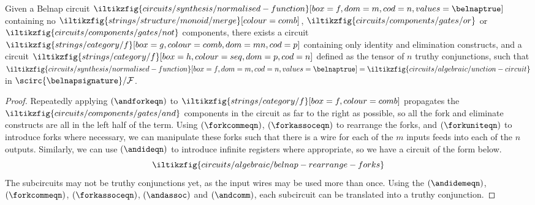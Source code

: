 \begin{lemma}\label{lem:truthy-conjunction-normalising}
    Given a Belnap circuit \(
    \iltikzfig{circuits/synthesis/normalised-function}[box=f,dom=m,cod=n,values=\belnaptrue]
    \) containing no \(
    \iltikzfig{strings/structure/monoid/merge}[colour=comb]
    \), \(
    \iltikzfig{circuits/components/gates/or}
    \) or \(
    \iltikzfig{circuits/components/gates/not}
    \) components, there exists a circuit \(
    \iltikzfig{strings/category/f}[box=g,colour=comb,dom=mn,cod=p]
    \) containing only identity and elimination constructs, and a circuit \(
    \iltikzfig{strings/category/f}[box=h,colour=seq,dom=p,cod=n]
    \) defined as the tensor of \(n\) truthy conjunctions, such that \(
    \iltikzfig{circuits/synthesis/normalised-function}[box=f,dom=m,cod=n,values=\belnaptrue]
    =
    \iltikzfig{circuits/algebraic/unction-circuit}
    \) in \(\scirc{\belnapsignature} / \mathcal{F}\).
\end{lemma}
\begin{proof}
    Repeatedly applying \((\andforkeqn)\) to \(
    \iltikzfig{strings/category/f}[box=f,colour=comb]
    \) propagates the \(
    \iltikzfig{circuits/components/gates/and}
    \) components in the circuit as far to the right as possible, so all the
    fork and eliminate constructs are all in the left half of the term.
    Using \((\forkcommeqn)\), \((\forkassoceqn)\) to rearrange the forks, and
    \((\forkuniteqn)\) to introduce forks where necessary,
    we can manipulate these forks such that there is a wire for each of the \(m\)
    inputs feeds into each of the \(n\) outputs.
    Similarly, we can use \((\andideqn)\) to introduce infinite registers where
    appropriate, so we have a circuit of the form below. \[
        \iltikzfig{circuits/algebraic/belnap-rearrange-forks}
    \]
    The subcircuits may not be truthy conjunctions yet, as the input wires may
    be used more than once.
    Using the \((\andidemeqn)\), \((\forkcommeqn)\), \((\forkassoceqn)\),
    \((\andassoc)\) and \((\andcomm)\), each subcircuit can be translated into
    a truthy conjunction.
\end{proof}

